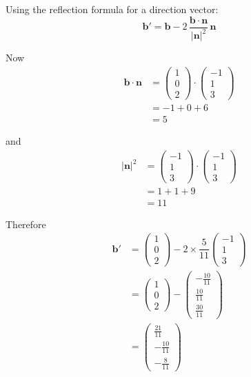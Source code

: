 \documentclass[leqno]{article}
\begin{document}
\begin{enumerate}[
  label=\textbf{\arabic*.},
  leftmargin=*,
  topsep=0pt,
  partopsep=0pt,
  parsep=0pt
]
\begin{djsSolution}
\begin{enumerate}[label=\textbf{(\alph*)}]
Using the reflection formula for a direction vector:
\[
\mathbf b'
=\mathbf b-2\,\dfrac{\mathbf b\cdot\mathbf n}{|\mathbf n|^2}\,\mathbf n
\]

Now
\begin{align*}
\mathbf b\cdot\mathbf n
&=
\begin{pmatrix}1\\0\\2\end{pmatrix}\cdot
\begin{pmatrix}-1\\1\\3\end{pmatrix}\\
&=-1+0+6\\
&=5
\end{align*}

and
\begin{align*}
|\mathbf n|^2
&=
\begin{pmatrix}-1\\1\\3\end{pmatrix}\cdot
\begin{pmatrix}-1\\1\\3\end{pmatrix}\\
&=1+1+9\\
&=11
\end{align*}

Therefore
\begin{align*}
\mathbf b'
&=
\begin{pmatrix}1\\0\\2\end{pmatrix}
-2\times\dfrac{5}{11}
\begin{pmatrix}-1\\1\\3\end{pmatrix}\\
&=
\begin{pmatrix}1\\0\\2\end{pmatrix}
-\begin{pmatrix}-\frac{10}{11}\\[2pt]\frac{10}{11}\\[2pt]\frac{30}{11}\end{pmatrix}\\
&=
\begin{pmatrix}
\frac{21}{11}\\[2pt]
-\frac{10}{11}\\[2pt]
-\frac{8}{11}
\end{pmatrix}
\end{align*}


\end{enumerate}
\end{djsSolution}
\end{enumerate}
\end{document}
